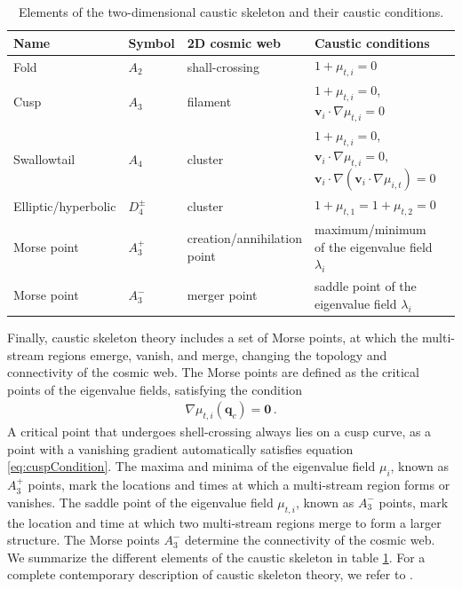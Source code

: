 \documentclass[a4paper, 11pt]{article}
\begin{document}
\begin{table}
\centering
{\scriptsize
\begin{tabular}{ |l | l | l | l | l|}
\hline
\textbf{Name} & \textbf{Symbol} & \textbf{2D cosmic web} & \textbf{Caustic conditions}\\
\hline
Fold & $A_2$ & shall-crossing & $1+ \mu_{t,i} = 0$ \\
\hline
Cusp & $A_3$ & filament & $1+ \mu_{t,i} = 0$, $\bm{v}_i \cdot \nabla \mu_{t,i} = 0$\\
\hline
Swallowtail &$A_4$ &  cluster & $1+ \mu_{t,i} = 0$, $\bm{v}_i \cdot \nabla \mu_{t,i} = 0,$ $\bm{v}_i \cdot \nabla(\bm{v}_i \cdot \nabla \mu_{i,t}) = 0$\\
\hline
Elliptic/hyperbolic & $D_4^{\pm}$ & cluster & $1+ \mu_{t,1} = 1+ \mu_{t,2} = 0$\\
\hline
Morse point & $A_3^+$ & creation/annihilation point& maximum/minimum of the eigenvalue field $\lambda_i$\\
\hline
Morse point & $A_3^-$ & merger point & saddle point of the eigenvalue field $\lambda_i$\\
\hline
\end{tabular}
}
\caption{Elements of the two-dimensional caustic skeleton and their caustic conditions.}
\label{table:caustics}
\end{table}



Finally, caustic skeleton theory includes a set of Morse points, at which the multi-stream regions emerge, vanish, and merge, changing the topology and connectivity of the cosmic web. The Morse points are defined as the critical points of the eigenvalue fields, satisfying the condition
\begin{align}
\nabla \mu_{t,i}(\bm{q}_c)=\bm{0}\,.
\end{align}
A critical point that undergoes shell-crossing always lies on a cusp curve, as a point with a vanishing gradient automatically satisfies equation \eqref{eq:cuspCondition}. The maxima and minima of the eigenvalue field $\mu_i$, known as $A_3^+$ points, mark the locations and times at which a multi-stream region forms or vanishes. The saddle point of the eigenvalue field $\mu_{t,i}$, known as $A_3^-$ points, mark the location and time at which two multi-stream regions merge to form a larger structure. The Morse points $A_3^-$ determine the connectivity of the cosmic web. We summarize the different elements of the caustic skeleton in table \ref{table:caustics}. For a complete contemporary description of caustic skeleton theory, we refer to \cite{Hidding:2014, Feldbrugge:2018}. 
\end{document}

